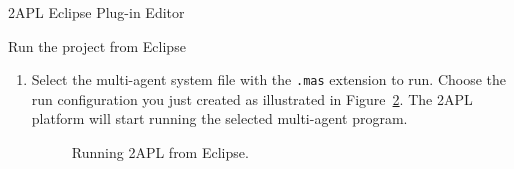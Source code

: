 \begin{section}{2APL Eclipse Plug-in Editor}
\begin{section}{Run the project from Eclipse}
\begin{enumerate}
        These steps are illustrated in Figure~\ref{fig:platform}.
        Note that the required paths are correctly entered. It is also important to note that
        the behavior of the run configuration can be modified by changing the
        Arguments. Add the option \texttt{-nogui} after \texttt{-nojade} to
        disable the 2APL GUI. Or leave the \texttt{-nojade} option out of the
        Arguments to get a choice to enable the jade platform.
        \begin{figure}[ht]
                \begin{center}
                \end{center}
                \caption{Creating a direct 2APL Run item in Eclipse.}\label{fig:platform}
            \end{figure}

    \item Select the multi-agent system file with the \texttt{.mas} extension to run.
    Choose the run configuration you just created as illustrated in
    Figure~\ref{fig:run}. The 2APL platform will start running the selected multi-agent program.
        \begin{figure}[ht]
            \begin{center}
            \end{center}
            \caption{Running 2APL from Eclipse.}\label{fig:run}
        \end{figure}

    \end{enumerate}
\end{section}
\end{section}
